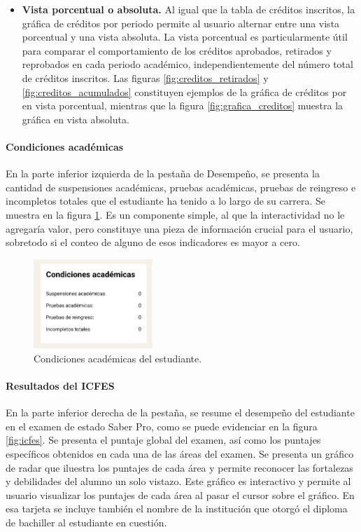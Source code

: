 \begin{itemize}
  \item \textbf{Vista porcentual o absoluta.} Al igual que la tabla de créditos inscritos, la gráfica de créditos por periodo permite al usuario alternar entre una vista porcentual y una vista absoluta. La vista porcentual es particularmente útil para comparar el comportamiento de los créditos aprobados, retirados y reprobados en cada periodo académico, independientemente del número total de créditos inscritos. Las figuras \ref{fig:creditos_retirados} y \ref{fig:creditos_acumulados} constituyen ejemplos de la gráfica de créditos por en vista porcentual, mientras que la figura \ref{fig:grafica_creditos} muestra la gráfica en vista absoluta.
\end{itemize}

\paragraph{Condiciones académicas} En la parte inferior izquierda de la pestaña de Desempeño, se presenta la cantidad de suspensiones académicas, pruebas académicas, pruebas de reingreso e incompletos totales que el estudiante ha tenido a lo largo de su carrera. Se muestra en la figura \ref{fig:condiciones_academicas}. Es un componente simple, al que la interactividad no le agregaría valor, pero constituye una pieza de información crucial para el usuario, sobretodo si el conteo de alguno de esos indicadores es mayor a cero.

\begin{figure}[H]
  \centering
  \includegraphics[width=0.4\textwidth]{img/nes/condiciones_academicas.png}
  \caption{Condiciones académicas del estudiante.}
  \label{fig:condiciones_academicas}
\end{figure}

\paragraph{Resultados del ICFES} En la parte inferior derecha de la pestaña, se resume el desempeño del estudiante en el examen de estado Saber Pro, como se puede evidenciar en la figura \ref{fig:icfes}. Se presenta el puntaje global del examen, así como los puntajes específicos obtenidos en cada una de las áreas del examen. Se presenta un gráfico de radar que iluestra los puntajes de cada área y permite reconocer las fortalezas y debilidades del alumno un solo vistazo. Este gráfico es interactivo y permite al usuario visualizar los puntajes de cada área al pasar el cursor sobre el gráfico. En esa tarjeta se incluye también el nombre de la institución que otorgó el diploma de bachiller al estudiante en cuestión.

